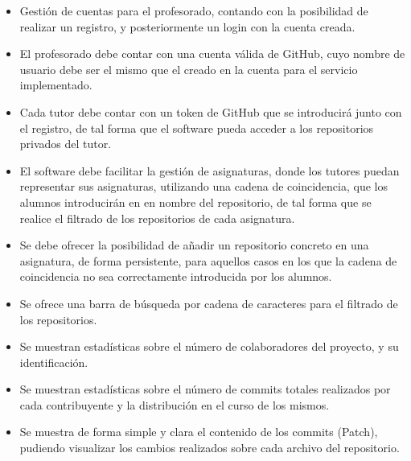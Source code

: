 \begin{itemize}
	\item Gestión de cuentas para el profesorado, contando con la posibilidad de realizar un registro, y posteriormente un login con la cuenta creada.
	\item El profesorado debe contar con una cuenta válida de GitHub, cuyo nombre de usuario debe ser el mismo que el creado en la cuenta para el servicio implementado.
	\item Cada tutor debe contar con un token de GitHub que se introducirá junto con el registro, de tal forma que el software pueda acceder a los repositorios privados del tutor.
	\item El software debe facilitar la gestión de asignaturas, donde los tutores puedan representar sus asignaturas, utilizando una cadena de coincidencia, que los alumnos introducirán en en nombre del repositorio, de tal forma que se realice el filtrado de los repositorios de cada asignatura.
	\item Se debe ofrecer la posibilidad de añadir un repositorio concreto en una asignatura, de forma persistente, para aquellos casos en los que la cadena de coincidencia no sea correctamente introducida por los alumnos.
	\item Se ofrece una barra de búsqueda por cadena de caracteres para el filtrado de los repositorios.
	\item Se muestran estadísticas sobre el número de colaboradores del proyecto, y su identificación.
	\item Se muestran estadísticas sobre el número de commits totales realizados por cada contribuyente y la distribución en el curso de los mismos.
	\item Se muestra de forma simple y clara el contenido de los commits (Patch), pudiendo visualizar los cambios realizados sobre cada archivo del repositorio.
 
	
\end{itemize}






